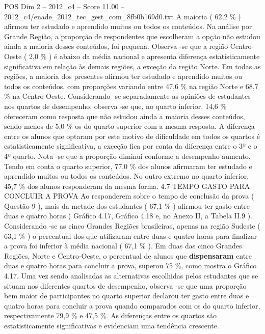 \begin{textsample}{POS Dim 2 – 2012\_c4 – Score 11.00 – 2012\_c4/enade\_2012\_tec\_gest\_com\_8fb0b169d0.txt}
A maioria ( 62,2 \% ) afirmou ter estudado e aprendido muitos ou todos os conteúdos.
Na análise por Grande Região, a proporção de respondentes que escolheram a opção não estudou ainda a maioria desses conteúdos, foi pequena.
Observa -se que a região Centro-Oeste ( 2,0 \% ) é abaixo da média nacional e apresenta diferença estatisticamente significativa em relação às demais regiões, a exceção da região Norte.
Em todas as regiões, a maioria dos presentes afirmou ter estudado e aprendido muitos ou todos os conteúdos, com proporções variando entre 47,6 \% na região Norte e 68,7 \% na Centro-Oeste.
Considerando -se separadamente as opiniões de estudantes nos quartos de desempenho, observa -se que, no quarto inferior, 14,6 \% ofereceram como resposta que não estudou ainda a maioria desses conteúdos, sendo menos de 5,0 \% os do quarto superior com a mesma resposta.
A diferença entre os alunos que optaram por este motivo de dificuldade em todos os quartos é estatisticamente significativa, a exceção fica por conta da diferença entre o 3º e o 4º quarto.
Nota -se que a proporção diminui conforme a desempenho aumento.
Tendo em conta o quarto superior, 77,0 \% dos alunos afirmaram ter estudado e aprendido muitos ou todos os conteúdos.
No outro extremo no quarto inferior, 45,7 \% dos alunos responderam da mesma forma. 4.7 TEMPO GASTO PARA CONCLUIR A PROVA Ao responderem sobre o tempo de conclusão da prova ( Questão 9 ), mais da metade dos estudantes ( 67,1 \% ) afirmou ter gasto entre duas e quatro horas ( Gráfico 4.17, Gráfico 4.18 e, no Anexo II, a Tabela II.9 ).
Considerando -se as cinco Grandes Regiões brasileiras, apenas na região Sudeste ( 63,1 \% ) o percentual dos que utilizaram entre duas e quatro horas para finalizar a prova foi inferior à média nacional ( 67,1 \% ).
Em duas das cinco Grandes Regiões, Norte e Centro-Oeste, o percentual de alunos que \textbf{dispensaram} entre duas e quatro horas para concluir a prova, superou 75 \%, como mostra o Gráfico 4.17.
Uma vez sendo analisadas as alternativas escolhidas pelos estudantes que se situam nos diferentes quartos de desempenho, observa -se que uma proporção bem maior de participantes no quarto superior declarou ter gasto entre duas e quatro horas para concluir a prova quando comparados com os do quarto inferior, respectivamente 79,9 \% e 47,5 \%.
As diferenças entre os quartos são estatisticamente significativas e evidenciam uma tendência crescente.

\end{textsample}
